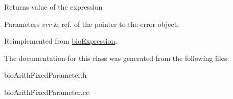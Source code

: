 \begin{DoxyReturn}{Returns}
value of the expression 
\end{DoxyReturn}

\begin{DoxyParams}{Parameters}
{\em err} & ref. of the pointer to the error object. \\
\hline
\end{DoxyParams}


Reimplemented from \hyperlink{classbio_expression_af58662a5d4d456f15bc4f2c9bd4f8a5b}{bio\+Expression}.



The documentation for this class was generated from the following files\+:\begin{DoxyCompactItemize}
\item 
bio\+Arith\+Fixed\+Parameter.\+h\item 
bio\+Arith\+Fixed\+Parameter.\+cc\end{DoxyCompactItemize}
